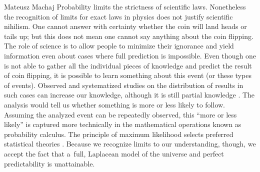 \begin{artengenv}{Mateusz Machaj}
Probability limits the strictness of scientific laws. Nonetheless the recognition of limits for exact laws in physics does not justify scientific nihilism. One cannot answer with certainty whether the coin will land heads or tails up; but this does not mean one cannot say anything about the coin flipping. The role of science is to allow people to minimize their ignorance and yield information even about cases where full prediction is impossible. Even though one is not able to gather all the individual pieces of knowledge and predict the result of coin flipping, it is possible to learn something about this event (or these types of events). Observed and systematized studies on the distribution of results in such cases can increase our knowledge, although it is still partial knowledge 
\parencite[][p.254]{kyburg_probability_1966}. %
 The analysis would tell us whether something is more or less likely to follow. Assuming the analyzed event can be repeatedly observed, this ``more or less likely'' is captured more technically in the mathematical operations known as probability calculus. The principle of maximum likelihood selects preferred statistical theories 
\parencite[][p.328]{swinburne_probability_1971}. %
 Because we recognize limits to our understanding, though, we accept the fact that a~full, Laplacean model of the universe and perfect predictability is unattainable.




\end{artengenv}
